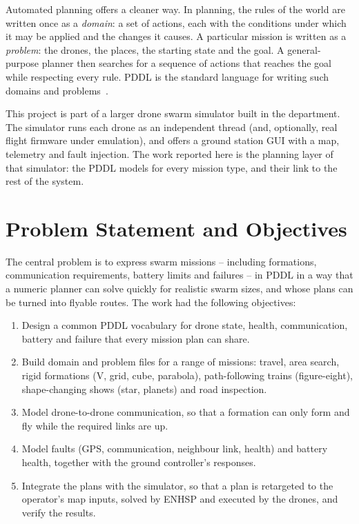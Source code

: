 \documentclass[11pt,a4paper,oneside]{report}
\begin{document}
Automated planning offers a cleaner way. In planning, the rules of the world are written once as
a \emph{domain}: a set of actions, each with the conditions under which it may be applied and the
changes it causes. A particular mission is written as a \emph{problem}: the drones, the places,
the starting state and the goal. A general-purpose planner then searches for a sequence of
actions that reaches the goal while respecting every rule. PDDL is the standard language for
writing such domains and problems~\cite{mcdermott1998pddl,fox2003pddl21}.

This project is part of a larger drone swarm simulator built in the department. The simulator
runs each drone as an independent thread (and, optionally, real flight firmware under
emulation), and offers a ground station GUI with a map, telemetry and fault injection. The work
reported here is the planning layer of that simulator: the PDDL models for every mission type,
and their link to the rest of the system.

\section{Problem Statement and Objectives}
The central problem is to express swarm missions -- including formations, communication
requirements, battery limits and failures -- in PDDL in a way that a numeric planner can solve
quickly for realistic swarm sizes, and whose plans can be turned into flyable routes. The work
had the following objectives:
\begin{enumerate}
  \item Design a common PDDL vocabulary for drone state, health, communication, battery and
        failure that every mission plan can share.
  \item Build domain and problem files for a range of missions: travel, area search, rigid
        formations (V, grid, cube, parabola), path-following trains (figure-eight), shape-changing
        shows (star, planets) and road inspection.
  \item Model drone-to-drone communication, so that a formation can only form and fly while the
        required links are up.
  \item Model faults (GPS, communication, neighbour link, health) and battery health, together
        with the ground controller's responses.
  \item Integrate the plans with the simulator, so that a plan is retargeted to the operator's map
        inputs, solved by ENHSP and executed by the drones, and verify the results.
\end{enumerate}
\end{document}
